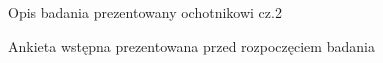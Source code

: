 \documentclass{./assets/wfis}
\begin{document}
\begin{figure}[h!]
    \centering
    \caption{Opis badania prezentowany ochotnikowi cz.2}
    \label{zgoda-na-przetwarzanie-danych}
\end{figure}

\begin{figure}[h!]
    \centering
    \caption{Ankieta wstępna prezentowana przed rozpoczęciem badania}
    \label{pytania-ankiety-wejsciowej}
\end{figure}
\end{document}
